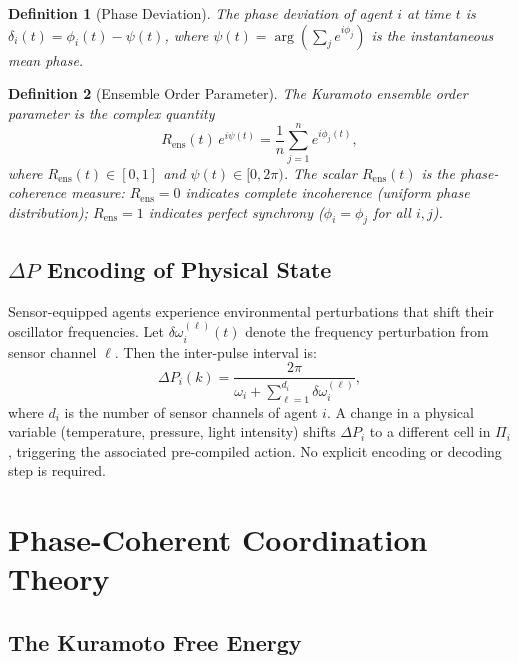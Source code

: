\documentclass[twocolumn,10pt]{article}
\newtheorem{definition}{Definition}[section]
\newcommand{\Rens}{R_{\mathrm{ens}}}
\newcommand{\DeltaP}{\Delta P}
\begin{document}
\begin{definition}[Phase Deviation]
\label{def:phase_dev}
The \emph{phase deviation} of agent $i$ at time $t$ is
$\delta_i(t) = \phi_i(t) - \psi(t)$, where $\psi(t) = \arg\!\left(
\sum_j e^{i\phi_j}\right)$ is the instantaneous mean phase.
\end{definition}

\begin{definition}[Ensemble Order Parameter]
\label{def:order_parameter}
The \emph{Kuramoto ensemble order parameter} is the complex quantity
\begin{equation}
\label{eq:order_param}
  \Rens(t)\, e^{i\psi(t)} = \frac{1}{n}\sum_{j=1}^{n} e^{i\phi_j(t)},
\end{equation}
where $\Rens(t) \in [0,1]$ and $\psi(t) \in [0,2\pi)$. The scalar $\Rens(t)$
is the \emph{phase-coherence measure}: $\Rens = 0$ indicates complete
incoherence (uniform phase distribution); $\Rens = 1$ indicates perfect
synchrony ($\phi_i = \phi_j$ for all $i,j$).
\end{definition}

\subsection{$\Delta P$ Encoding of Physical State}

Sensor-equipped agents experience environmental perturbations that shift their
oscillator frequencies. Let $\delta\omega_i^{(\ell)}(t)$ denote the frequency
perturbation from sensor channel $\ell$. Then the inter-pulse interval is:
\begin{equation}
\label{eq:deltap}
  \DeltaP_i(k) = \frac{2\pi}{\omega_i + \sum_{\ell=1}^{d_i}\delta\omega_i^{(\ell)}},
\end{equation}
where $d_i$ is the number of sensor channels of agent $i$. A change in a
physical variable (temperature, pressure, light intensity) shifts $\DeltaP_i$
to a different cell in $\Pi_i$, triggering the associated pre-compiled action.
No explicit encoding or decoding step is required.

\section{Phase-Coherent Coordination Theory}
\label{sec:theory}

\subsection{The Kuramoto Free Energy}
\end{document}
